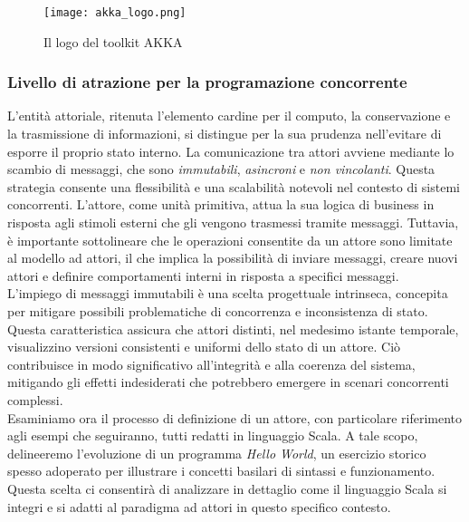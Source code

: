 \begin{figure}[H]
  \centering
  \texttt{[image: akka\_logo.png]}
  \caption[Logo AKKA]{Il logo del toolkit AKKA \cite{akka}}
\end{figure}

\subsubsection[Programmazione concorrente]{Livello di atrazione per la programazione concorrente}
L'entità attoriale, ritenuta l'elemento cardine per il computo, la conservazione e la trasmissione di informazioni, si distingue per la sua prudenza nell'evitare di esporre il proprio stato interno.
La comunicazione tra attori avviene mediante lo scambio di messaggi, che sono \textit{immutabili}, \textit{asincroni} e \textit{non vincolanti}.
Questa strategia consente una flessibilità e una scalabilità notevoli nel contesto di sistemi concorrenti.
L'attore, come unità primitiva, attua la sua logica di business in risposta agli stimoli esterni che gli vengono trasmessi tramite messaggi.
Tuttavia, è importante sottolineare che le operazioni consentite da un attore sono limitate al modello ad attori, il che implica la possibilità di inviare messaggi, creare nuovi attori e definire comportamenti interni in risposta a specifici messaggi. \\
L'impiego di messaggi immutabili è una scelta progettuale intrinseca, concepita per mitigare possibili problematiche di concorrenza e inconsistenza di stato.
Questa caratteristica assicura che attori distinti, nel medesimo istante temporale, visualizzino versioni consistenti e uniformi dello stato di un attore.
Ciò contribuisce in modo significativo all'integrità e alla coerenza del sistema, mitigando gli effetti indesiderati che potrebbero emergere in scenari concorrenti complessi. \\
Esaminiamo ora il processo di definizione di un attore, con particolare riferimento agli esempi che seguiranno, tutti redatti in linguaggio Scala.
A tale scopo, delineeremo l'evoluzione di un programma \textit{Hello World}, un esercizio storico spesso adoperato per illustrare i concetti basilari di sintassi e funzionamento.
Questa scelta ci consentirà di analizzare in dettaglio come il linguaggio Scala si integri e si adatti al paradigma ad attori in questo specifico contesto. 

 


